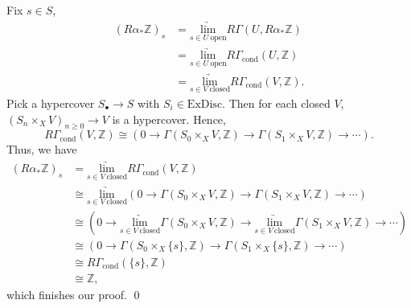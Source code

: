 \documentclass[UTF8,12,a4paper]{ctexart}
\theoremstyle{definition}
\begin{document}
\begin{itemize}
  	Fix $s\in S$,
  	\begin{align*}
  	(R\alpha_*\mathbb{Z})_s
  	&=\underset{s\in U\ \text{open}}{\underrightarrow{\text{lim}}}R\Gamma(U,R\alpha_*\mathbb{Z})\\
  	&=\underset{s\in U\ \text{open}}{\underrightarrow{\text{lim}}} R\Gamma_{\text{cond}}(U,\mathbb{Z})\\
  	&=\underset{s\in V\ \text{closed}}{\underrightarrow{\text{lim}}}R\Gamma_{\text{cond}}(V,\mathbb{Z}).
  	\end{align*}
  	Pick a hypercover $S_\bullet\to S$ with $S_i\in\text{ExDisc}$. Then for each closed $V$, $(S_n\times_{X} V)_{n\geq 0}\to V$ is a hypercover. Hence,
  	$$R\Gamma_{\text{cond}}(V,\mathbb{Z})\cong (0\longrightarrow \Gamma(S_0\times_{X} V,\mathbb{Z})\longrightarrow \Gamma(S_1\times_{X} V,\mathbb{Z})\longrightarrow\cdots).$$
  	Thus, we have
  	\begin{align*}
  	(R\alpha_*\mathbb{Z})_s
  	&=\underset{s\in V\ \text{closed}}{\underrightarrow{\text{lim}}}R\Gamma_{\text{cond}}(V,\mathbb{Z})\\
  	&\cong\underset{s\in V\ \text{closed}}{\underrightarrow{\text{lim}}}(0\longrightarrow \Gamma(S_0\times_{X} V,\mathbb{Z})\longrightarrow \Gamma(S_1\times_{X} V,\mathbb{Z})\longrightarrow\cdots)\\
  	&\cong(0\longrightarrow \underset{s\in V\ \text{closed}}{\underrightarrow{\text{lim}}}\Gamma(S_0\times_{X} V,\mathbb{Z})\longrightarrow\underset{s\in V\ \text{closed}}{\underrightarrow{\text{lim}}}\Gamma(S_1\times_{X} V,\mathbb{Z})\longrightarrow\cdots)\\
  	&\cong(0\longrightarrow \Gamma(S_0\times_{X} \{s\},\mathbb{Z})\longrightarrow \Gamma(S_1\times_{X} \{s\},\mathbb{Z})\longrightarrow\cdots)\\
  	&\cong R\Gamma_{\text{cond}}(\{s\},\mathbb{Z})\\
  	&\cong\mathbb{Z},
  	\end{align*}
  	which finishes our proof.
  	\qed
\end{itemize}
	
\end{document}
